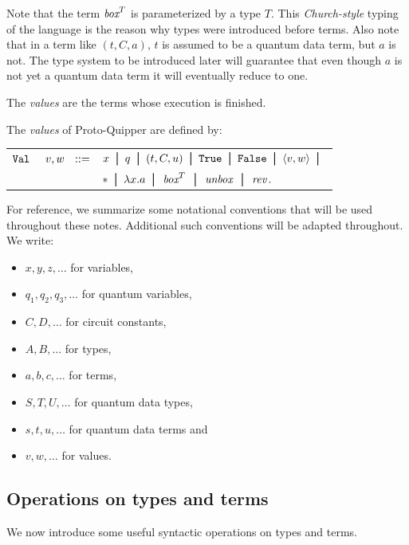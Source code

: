 \documentclass[twoside]{article}
\begin{document}
Note that the term $\mathop{\textit{box}}\nolimits^T$ is parameterized by a type $T$. This
\emph{Church-style} typing of the language is the reason why types
were introduced before terms. Also note that in a term like $(t,C,a)$,
$t$ is assumed to be a quantum data term, but $a$ is not. The type
system to be introduced later will guarantee that even though $a$ is
not yet a quantum data term it will eventually reduce to one.

The \emph{values} are the terms whose execution is finished.

\begin{definition}
The \emph{values} of Proto-Quipper are defined by:
\begin{center}
\begin{tabular}{rrl}
$\texttt{Val}$&$~v,w~~::=$ & $x \bor q \bor (t,C,u) \bor \true \bor 
  \false \bor \p{v,w} \bor$ \\
& & $* \bor \lambda x.a  \bor \boxx^T \bor \unbox \bor \rev.$
\end{tabular}
\end{center}
\end{definition}

\noindent
For reference, we summarize some notational conventions that will be
used throughout these notes. Additional such conventions will be
adapted throughout. We write:
\begin{itemize}
  \item $x,y,z,\ldots$ for variables,
  \item $q_1,q_2,q_3,\ldots$ for quantum variables,
  \item $C,D,\ldots$ for circuit constants,
  \item $A,B,\ldots$ for types,
  \item $a,b,c,\ldots$ for terms,
  \item $S,T,U,\ldots$ for quantum data types,
  \item $s,t,u,\ldots$ for quantum data terms and
  \item $v,w,\ldots$ for values.
\end{itemize}

\subsection{Operations on types and terms}

We now introduce some useful syntactic operations on types and terms. 
\end{document}
